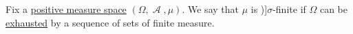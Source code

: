 \begin{definition}\label{def:sigma_finite_measure}
  Fix a \hyperref[def:measure/positive]{positive measure space} \( (\Omega, \mscrA, \mu) \). We say that \( \mu \) is \term[ru=\( \sigma \)-крайний (\cite[def. 1.6.1]{Богачёв2003ТеорияМерыТом1})]{\( \sigma \)-finite} if \( \Omega \) can be \hyperref[def:exhausting_sequence]{exhausted} by a sequence of sets of finite measure.
\end{definition}
